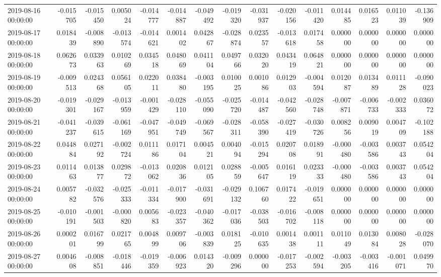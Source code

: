 \begin{tabular}{lrrrrrrrrrrrrrr}
2019-08-16 00:00:00 & -0.015705 & -0.015450 & 0.005024 & -0.014777 & -0.014887 & -0.049492 & -0.019320 & -0.031937 & -0.020156 & -0.011420 & 0.014485 & 0.016523 & 0.011039 & -0.136909 \\
2019-08-17 00:00:00 & 0.018439 & -0.008890 & -0.013574 & -0.014621 & 0.001402 & 0.042867 & -0.028874 & 0.023557 & -0.013618 & 0.017458 & 0.000000 & 0.000000 & 0.000000 & 0.000000 \\
2019-08-18 00:00:00 & 0.062673 & 0.033963 & 0.010269 & 0.034518 & 0.048069 & 0.041104 & 0.049766 & 0.032020 & 0.043419 & 0.064821 & 0.000000 & 0.000000 & 0.000000 & 0.000000 \\
2019-08-19 00:00:00 & -0.009513 & 0.024368 & 0.056105 & 0.022011 & 0.038480 & -0.003195 & 0.010025 & 0.001086 & 0.012903 & -0.004594 & 0.012087 & 0.013489 & 0.011128 & -0.090023 \\
2019-08-20 00:00:00 & -0.019301 & -0.029167 & -0.013959 & -0.001429 & -0.028110 & -0.055090 & -0.025720 & -0.014487 & -0.042560 & -0.028748 & -0.007871 & -0.006733 & -0.002333 & 0.036072 \\
2019-08-21 00:00:00 & -0.041237 & -0.039615 & -0.061169 & -0.047951 & -0.049749 & -0.069567 & -0.028311 & -0.058390 & -0.027419 & -0.030726 & 0.008256 & 0.009019 & 0.004709 & -0.102188 \\
2019-08-22 00:00:00 & 0.044884 & 0.027192 & -0.002724 & 0.011186 & 0.017104 & 0.004521 & 0.004094 & -0.015294 & 0.020708 & 0.018991 & -0.000480 & -0.003586 & 0.003743 & 0.054204 \\
2019-08-23 00:00:00 & 0.011463 & 0.013877 & 0.029872 & -0.013062 & 0.020836 & 0.012105 & 0.028859 & -0.005647 & 0.016119 & 0.023333 & -0.000480 & -0.003586 & 0.003743 & 0.054204 \\
2019-08-24 00:00:00 & 0.005782 & -0.032576 & -0.025333 & -0.011334 & -0.017900 & -0.031691 & -0.029132 & 0.106760 & 0.017422 & -0.019651 & 0.000000 & 0.000000 & 0.000000 & 0.000000 \\
2019-08-25 00:00:00 & -0.010191 & -0.001503 & -0.000820 & 0.005683 & -0.023357 & -0.040362 & -0.017036 & -0.038503 & -0.016702 & -0.008118 & 0.000000 & 0.000000 & 0.000000 & 0.000000 \\
2019-08-26 00:00:00 & 0.000201 & 0.016799 & 0.021765 & 0.004899 & 0.009706 & -0.003839 & 0.018125 & -0.010635 & 0.001438 & 0.001111 & 0.011049 & 0.013084 & 0.008028 & -0.028070 \\
2019-08-27 00:00:00 & 0.004608 & -0.008851 & -0.018446 & -0.019359 & -0.006923 & 0.014320 & -0.009296 & 0.000000 & -0.017253 & -0.002594 & -0.003205 & -0.003416 & -0.001071 & 0.049970 \\

\end{tabular}
